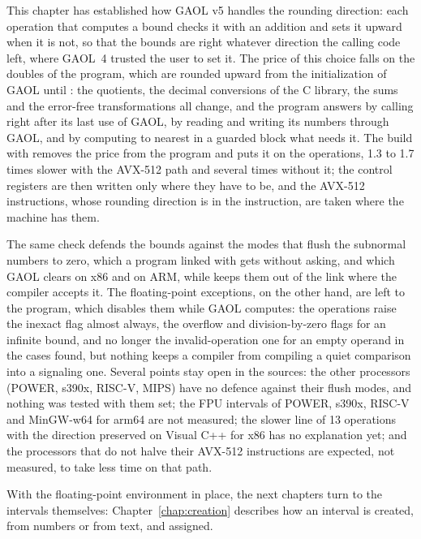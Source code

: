 \documentclass[12pt,a4paper,twoside,openright]{book}
\begin{document}
This chapter has established how GAOL v5 handles the rounding direction: each
operation that computes a bound checks it with an addition and sets it upward
when it is not, so that the bounds are right whatever direction the calling
code left, where GAOL~4 trusted the user to set it. The price of this choice
falls on the doubles of the program, which are rounded upward from the
initialization of GAOL until : the quotients, the decimal
conversions of the C library, the sums and the error-free transformations all
change, and the program answers by calling  right after its
last use of GAOL, by reading and writing its numbers through GAOL, and by
computing to nearest in a guarded block what needs it. The build with
 removes the price from the program and puts
it on the operations, 1.3 to 1.7 times slower with the AVX-512 path and
several times without it; the control registers are then written only where
they have to be, and the AVX-512 instructions, whose rounding direction is in
the instruction, are taken where the machine has them.

\medskip
The same check defends the bounds against the modes that flush the subnormal
numbers to zero, which a program linked with  gets without
asking, and which GAOL clears on x86 and on ARM, while 
keeps them out of the link where the compiler accepts it. The floating-point
exceptions, on the other hand, are left to the program, which disables them
while GAOL computes: the operations raise the inexact flag almost always, the
overflow and division-by-zero flags for an infinite bound, and no longer the
invalid-operation one for an empty operand in the cases found, but nothing
keeps a compiler from compiling a quiet comparison into a signaling one.
Several points stay open in the sources: the other processors (POWER, s390x,
RISC-V, MIPS) have no defence against their flush modes, and nothing was
tested with them set; the FPU intervals of POWER, s390x, RISC-V and
MinGW-w64 for arm64 are not measured; the slower line of 13 operations with
the direction preserved on Visual C++ for x86 has no explanation yet; and the
processors that do not halve their AVX-512 instructions are expected, not
measured, to take less time on that path.

\medskip
With the floating-point environment in place, the next chapters turn to the
intervals themselves: Chapter~\ref{chap:creation} describes how an interval
is created, from numbers or from text, and assigned.
\end{document}

